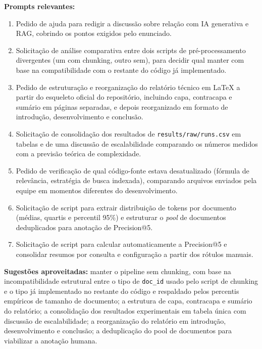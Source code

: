 \documentclass[12pt, a4paper]{article}
\begin{document}
\textbf{Prompts relevantes:}
\begin{enumerate}
    \item Pedido de ajuda para redigir a discussão sobre relação com IA generativa e RAG, cobrindo os pontos exigidos pelo enunciado.
    \item Solicitação de análise comparativa entre dois scripts de pré-processamento divergentes (um com chunking, outro sem), para decidir qual manter com base na compatibilidade com o restante do código já implementado.
    \item Pedido de estruturação e reorganização do relatório técnico em LaTeX a partir do esqueleto oficial do repositório, incluindo capa, contracapa e sumário em páginas separadas, e depois reorganizado em formato de introdução, desenvolvimento e conclusão.
    \item Solicitação de consolidação dos resultados de \texttt{results/raw/runs.csv} em tabelas e de uma discussão de escalabilidade comparando os números medidos com a previsão teórica de complexidade.
    \item Pedido de verificação de qual código-fonte estava desatualizado (fórmula de relevância, estratégia de busca indexada), comparando arquivos enviados pela equipe em momentos diferentes do desenvolvimento.
    \item Solicitação de script para extrair distribuição de tokens por documento (médias, quartis e percentil 95\%) e estruturar o \textit{pool} de documentos deduplicados para anotação de Precision@5.
    \item Solicitação de script para calcular automaticamente a Precision@5 e consolidar resumos por consulta e configuração a partir dos rótulos manuais.
\end{enumerate}

\textbf{Sugestões aproveitadas:} manter o pipeline sem chunking, com base na incompatibilidade estrutural entre o tipo de \texttt{doc\_id} usado pelo script de chunking e o tipo já implementado no restante do código e respaldado pelos percentis empíricos de tamanho de documento; a estrutura de capa, contracapa e sumário do relatório; a consolidação dos resultados experimentais em tabela única com discussão de escalabilidade; a reorganização do relatório em introdução, desenvolvimento e conclusão; a deduplicação do pool de documentos para viabilizar a anotação humana.
\end{document}
